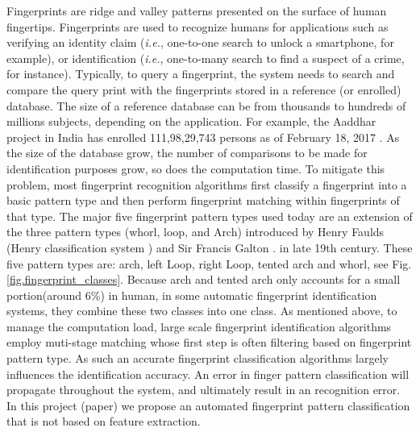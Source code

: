 

Fingerprints are ridge and valley patterns presented on the surface of human fingertips.
%
Fingerprints are used to recognize humans for applications such as verifying an identity claim (\textit{i.e.}, one-to-one search to  unlock a smartphone, for example), or identification (\textit{i.e.}, one-to-many search to find a suspect of a crime, for instance).
%
Typically, to query a fingerprint, the system needs to search and compare the query print with the fingerprints stored in a reference (or enrolled) database.  The size of a reference database can be from thousands to hundreds of millions subjects, depending on the application. For example, the Aaddhar project in India has enrolled 111,98,29,743 persons as of February 18, 2017 \cite{aaddhar}. 
%
As the size of the database grow, the number of comparisons to be made for identification purposes grow, so does the computation time.
%
To mitigate this problem, most fingerprint recognition algorithms first classify a fingerprint into a basic pattern type and then perform fingerprint matching within fingerprints of that type.
%
The major five fingerprint pattern types used today are an extension of the three pattern types (whorl, loop, and Arch) introduced by Henry Faulds (Henry classification system \cite{henry1905classification}) and Sir Francis Galton \cite{galton1892}. in late 19th century. These five pattern types are: arch, left Loop, right Loop, tented arch and whorl, see Fig.\ref{fig.fingerprint_classes}.  
%
Because arch and tented arch only accounts for a small portion(around 6\%) in human, in some automatic fingerprint identification systems, they combine these two classes into one class. 
%
As mentioned above, to manage the computation load, large scale fingerprint identification algorithms employ muti-stage matching whose first step is often filtering based on fingerprint pattern type. As such an accurate fingerprint classification algorithms largely influences the identification accuracy. An error in finger pattern classification will propagate throughout the system, and ultimately result in an recognition error. In this project (paper) we propose an automated fingerprint pattern classification that is not based on feature extraction.

